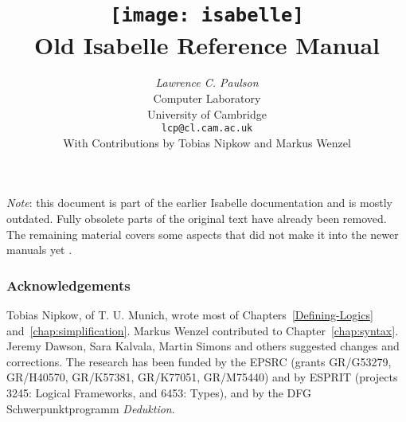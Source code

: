 \documentclass[12pt,a4paper]{report}
\title{\texttt{[image: isabelle]} \\[4ex] Old Isabelle Reference Manual}
\author{{\em Lawrence C. Paulson}\\
        Computer Laboratory \\ University of Cambridge \\
        \texttt{lcp@cl.cam.ac.uk}\\[3ex] 
        With Contributions by Tobias Nipkow and Markus Wenzel}
\begin{document}
\underscoreoff


\maketitle 
\emph{Note}: this document is part of the earlier Isabelle
documentation and is mostly outdated.  Fully obsolete parts of the
original text have already been removed.  The remaining material
covers some aspects that did not make it into the newer manuals yet
\cite{isabelle-isar-ref,isabelle-implementation}.

\subsubsection*{Acknowledgements} 
Tobias Nipkow, of T. U. Munich, wrote most of
  Chapters~\protect\ref{Defining-Logics} and~\protect\ref{chap:simplification}.
  Markus Wenzel contributed to Chapter~\protect\ref{chap:syntax}.
  Jeremy Dawson, Sara Kalvala, Martin
  Simons  and others suggested changes
  and corrections.  The research has been funded by the EPSRC (grants
  GR/G53279, GR/H40570, GR/K57381, GR/K77051, GR/M75440) and by ESPRIT
  (projects 3245: Logical Frameworks, and 6453: Types), and by the DFG
  Schwerpunktprogramm \emph{Deduktion}.

 \tableofcontents \clearfirst





\begingroup
   \small\raggedright\frenchspacing
  
\endgroup
\end{document}
